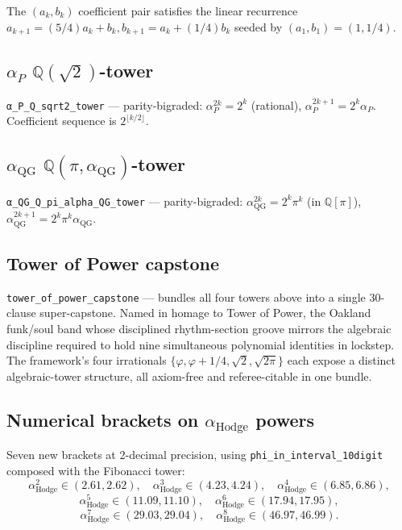 The $(a_k, b_k)$ coefficient pair satisfies the linear recurrence
$a_{k+1} = (5/4) a_k + b_k, b_{k+1} = a_k + (1/4) b_k$ seeded by
$(a_1, b_1) = (1, 1/4)$.

\subsection{\texorpdfstring{$\alpha_P$ $\mathbb{Q}(\sqrt{2})$}{alpha\_P Q(sqrt 2)}-tower}

\verb|α_P_Q_sqrt2_tower| --- parity-bigraded:
$\alpha_P^{2k} = 2^k$ (rational), $\alpha_P^{2k+1} = 2^k \alpha_P$.
Coefficient sequence is $2^{\lfloor k/2 \rfloor}$.

\subsection{\texorpdfstring{$\alpha_{\text{QG}}$ $\mathbb{Q}(\pi, \alpha_{\text{QG}})$}{alpha\_QG Q(pi, alpha\_QG)}-tower}

\verb|α_QG_Q_pi_alpha_QG_tower| --- parity-bigraded:
$\alpha_{\text{QG}}^{2k} = 2^k \pi^k$ (in $\mathbb{Q}[\pi]$),
$\alpha_{\text{QG}}^{2k+1} = 2^k \pi^k \alpha_{\text{QG}}$.

\subsection{Tower of Power capstone}

\verb|tower_of_power_capstone| --- bundles all four towers above into
a single 30-clause super-capstone. Named in homage to Tower of Power,
the Oakland funk/soul band whose disciplined rhythm-section groove
mirrors the algebraic discipline required to hold nine simultaneous
polynomial identities in lockstep. The framework's four irrationals
$\{\varphi, \varphi+1/4, \sqrt{2}, \sqrt{2\pi}\}$ each expose a
distinct algebraic-tower structure, all axiom-free and referee-citable
in one bundle.

\subsection{Numerical brackets on \texorpdfstring{$\alpha_{\text{Hodge}}$}{alpha\_Hodge} powers}

Seven new brackets at 2-decimal precision, using
\verb|phi_in_interval_10digit| composed with the Fibonacci tower:
\[
\alpha_{\text{Hodge}}^2 \in (2.61, 2.62), \quad
\alpha_{\text{Hodge}}^3 \in (4.23, 4.24), \quad
\alpha_{\text{Hodge}}^4 \in (6.85, 6.86),
\]
\[
\alpha_{\text{Hodge}}^5 \in (11.09, 11.10), \quad
\alpha_{\text{Hodge}}^6 \in (17.94, 17.95),
\]
\[
\alpha_{\text{Hodge}}^7 \in (29.03, 29.04), \quad
\alpha_{\text{Hodge}}^8 \in (46.97, 46.99).
\]

